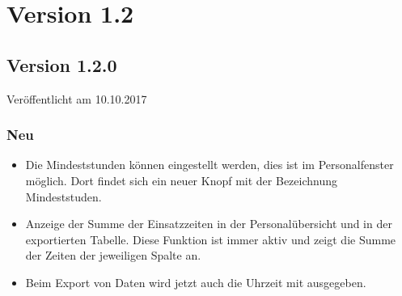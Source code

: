 \section{Version 1.2}\label{versionshistorie:1:2}
\subsection{Version 1.2.0}
\label{version:1:2:0}
Veröffentlicht am 10.10.2017
\subsubsection{Neu}
\begin{itemize}
  \item
  Die Mindeststunden können eingestellt werden, dies ist im Personalfenster möglich. Dort findet sich ein neuer Knopf mit der Bezeichnung Mindeststuden.
  \item
  Anzeige der Summe der Einsatzzeiten in der Personalübersicht und in der exportierten Tabelle. Diese Funktion ist immer aktiv und zeigt die Summe der Zeiten der jeweiligen Spalte an.
  \item
  Beim Export von Daten wird jetzt auch die Uhrzeit mit ausgegeben.
\end{itemize}

